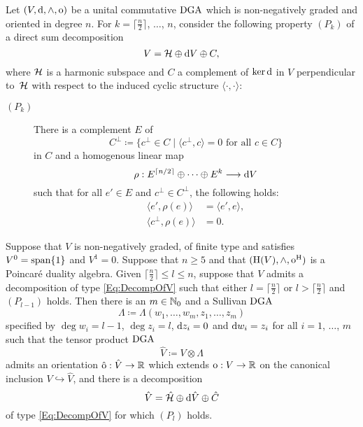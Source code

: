 \documentclass[\MainFolder/Text.tex]{subfiles}
\begin{document}
\begin{Lemma}\label{Lemma:Exte}
 Let $(V,\mathrm{d},\wedge,\mathrm{o})$ be a unital commutative $\mathrm{DGA}$ which is non-negatively graded and oriented in degree $n$.
 For $k=\lceil\frac{n}{2}\rceil$, $\dotsc$, $n$, consider the following property $(P_k)$ of a direct sum decomposition%
\begin{equation}\label{Eq:DecompOfV}
V=\mathcal{H}\oplus \mathrm{d} V \oplus C,
\end{equation}
where $\mathcal{H}$ is a harmonic subspace and $C$ a complement of $\ker \mathrm{d}$ in $V$ perpendicular to~$\mathcal{H}$ with respect to the induced cyclic structure $\langle\cdot,\cdot\rangle$:
\begin{description}
\item[$(P_{k})$] There is a complement $E$ of
\[
C^\perp\coloneqq \{ c^\perp \in C \mid \langle c^\perp,c\rangle=0\text{ for all }c\in C\}
\]
in $C$ and a homogenous linear map 
\[
\rho:  E^{\lceil n/2\rceil}\oplus \dotsb \oplus E^{k} \longrightarrow \mathrm{d} V
\]
such that for all $e'\in E$ and $c^\perp\in C^\perp$, the following holds:
\begin{align}
\langle e', \rho(e) \rangle &=\langle e', e \rangle, \label{Eq:ConditionTemp} \\
\langle c^\perp, \rho(e) \rangle &=  0.\label{Eq:ConditionTempII}
\end{align}
\end{description}
Suppose that $V$ is non-negatively graded, of finite type and satisfies $V^0=\mathrm{span}\{1\}$ and $V^1 = 0$.
Suppose that $n \ge 5$ and that $(\mathrm{H}(V), \wedge, \mathrm{o}^{\mathrm{H}})$ is a Poincar\'e duality algebra.
Given $\lceil\frac{n}{2}\rceil\le l\le n$, suppose that $V$ admits a decomposition of type \eqref{Eq:DecompOfV} such that either $l=\lceil\frac{n}{2}\rceil$ or $l>\lceil\frac{n}{2}\rceil$ and $(P_{l-1})$ holds.
Then there is an $m\in \mathbb{N}_0$ and a Sullivan $\mathrm{DGA}$ 
 \begin{equation}\label{Eq:SullAlg}
 \Lambda \coloneqq \Lambda(w_1,\dotsc,w_m,z_1,\dotsc,z_m)
 \end{equation}
 specified by $\deg w_i = l-1$, $\deg z_i = l$, $\mathrm{d} z_i = 0$ and $\mathrm{d} w_i = z_i$ for all $i=1$, $\dotsc$, $m$ such that the tensor product $\mathrm{DGA}$ 
\[
 \hat{V}\coloneqq V\otimes \Lambda
 \]
 admits an orientation $\hat{\mathrm{o}}: \hat{V}\to\mathbb{R}$ which extends $\mathrm{o}: V \rightarrow \mathbb{R}$ on the canonical inclusion $V \hookrightarrow\hat{V}$, and there is a decomposition
\begin{equation}\label{Eq:DevompOfVHat}
\hat{V} = \hat{\mathcal{H}}\oplus \mathrm{d} \hat{V}\oplus \hat{C}
\end{equation}
of type \eqref{Eq:DecompOfV} for which $(P_{l})$ holds.
\end{Lemma}
\end{document}
